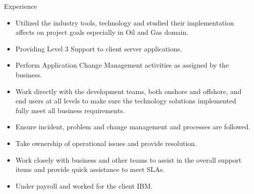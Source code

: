 \documentclass{resume} %
\begin{document}
\begin{workSection}{Experience}
    \experienceItem[
        company=IBM India Pvt. Ltd.,
        location=Bengaluru,
        position=System Engineer (Application Developer .NET),
        duration=Dec 2021 – Jun 2023
    ]
    \begin{itemize}
        \itemsep -6pt {} 
      
        \item Utilized the industry tools, technology and studied their implementation affects on project goals especially in Oil and Gas domain.
        \item Providing Level 3 Support to client server applications.
        \item Perform Application Change Management activities as assigned by the business.
        \item Work directly with the development teams, both onshore and offshore, and end users at all levels to make sure the technology solutions implemented fully meet all business requirements.
        \item Ensure incident, problem and change management and processes are followed.
        \item Take ownership of operational issues and provide resolution.
        \item Work closely with business and other teams to assist in the overall support items and provide quick assistance to meet SLAs.

     \end{itemize}
    
    \experienceItem[
        company=Collabera Technologies Pvt. Ltd.,
        location=Pune,
        position=Application Developer .NET at IBM,
        duration=Apr 2019 – Dec 2021
    ]
    \begin{itemize}
        \itemsep -6pt {} 
        \item Under payroll and worked for the client IBM.

     \end{itemize}   
     
\end{workSection}
\end{document}
